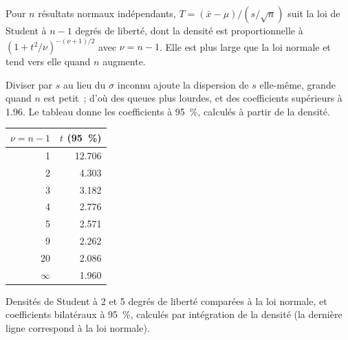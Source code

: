 \begin{proposition}\label{prop:b2:measurement-statistics:student}
Pour $n$ résultats normaux indépendants, $T = (\bar x - \mu)/(s/\sqrt n)$ suit la loi de Student à
$n - 1$ degrés de liberté, dont la densité est proportionnelle à $(1 + t^2/\nu)^{-(\nu+1)/2}$ avec
$\nu = n - 1$. Elle est plus large que la loi normale et tend vers elle quand $n$ augmente.
\end{proposition}

\admitted

Diviser par $s$ au lieu du $\sigma$ inconnu ajoute la dispersion de $s$ elle-même, grande quand $n$ est
petit~; d'où des queues plus lourdes, et des coefficients supérieurs à 1.96. Le tableau donne les
coefficients à 95~\%, calculés à partir de la densité.

\begin{omfigure}
\begin{minipage}[c]{0.56\linewidth}
\end{minipage}\hfill
\begin{minipage}[c]{0.4\linewidth}\centering
\small
\begin{tabular}{rr}
\hline
$\nu = n - 1$ & $t$ (95~\%) \\
\hline
1 & 12.706 \\
2 & 4.303 \\
3 & 3.182 \\
4 & 2.776 \\
5 & 2.571 \\
9 & 2.262 \\
20 & 2.086 \\
$\infty$ & 1.960 \\
\hline
\end{tabular}
\end{minipage}
\par\vspace{4pt}

{\small Densités de Student à 2 et 5 degrés de liberté comparées à la loi normale, et coefficients
bilatéraux à 95~\%, calculés par intégration de la densité (la dernière ligne correspond à la loi normale).}
\end{omfigure}

